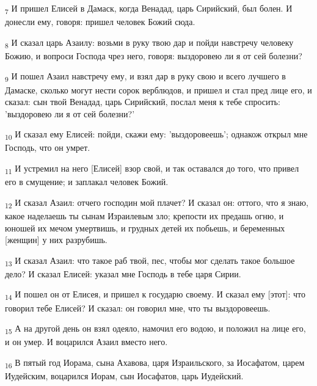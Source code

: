 \begin{tcolorbox}
\textsubscript{7} И пришел Елисей в Дамаск, когда Венадад, царь Сирийский, был болен. И донесли ему, говоря: пришел человек Божий сюда.
\end{tcolorbox}
\begin{tcolorbox}
\textsubscript{8} И сказал царь Азаилу: возьми в руку твою дар и пойди навстречу человеку Божию, и вопроси Господа чрез него, говоря: выздоровею ли я от сей болезни?
\end{tcolorbox}
\begin{tcolorbox}
\textsubscript{9} И пошел Азаил навстречу ему, и взял дар в руку свою и всего лучшего в Дамаске, сколько могут нести сорок верблюдов, и пришел и стал пред лице его, и сказал: сын твой Венадад, царь Сирийский, послал меня к тебе спросить: 'выздоровею ли я от сей болезни?'
\end{tcolorbox}
\begin{tcolorbox}
\textsubscript{10} И сказал ему Елисей: пойди, скажи ему: 'выздоровеешь'; однакож открыл мне Господь, что он умрет.
\end{tcolorbox}
\begin{tcolorbox}
\textsubscript{11} И устремил на него [Елисей] взор свой, и так оставался до того, что привел его в смущение; и заплакал человек Божий.
\end{tcolorbox}
\begin{tcolorbox}
\textsubscript{12} И сказал Азаил: отчего господин мой плачет? И сказал он: оттого, что я знаю, какое наделаешь ты сынам Израилевым зло; крепости их предашь огню, и юношей их мечом умертвишь, и грудных детей их побьешь, и беременных [женщин] у них разрубишь.
\end{tcolorbox}
\begin{tcolorbox}
\textsubscript{13} И сказал Азаил: что такое раб твой, пес, чтобы мог сделать такое большое дело? И сказал Елисей: указал мне Господь в тебе царя Сирии.
\end{tcolorbox}
\begin{tcolorbox}
\textsubscript{14} И пошел он от Елисея, и пришел к государю своему. И сказал ему [этот]: что говорил тебе Елисей? И сказал: он говорил мне, что ты выздоровеешь.
\end{tcolorbox}
\begin{tcolorbox}
\textsubscript{15} А на другой день он взял одеяло, намочил его водою, и положил на лице его, и он умер. И воцарился Азаил вместо него.
\end{tcolorbox}
\begin{tcolorbox}
\textsubscript{16} В пятый год Иорама, сына Ахавова, царя Израильского, за Иосафатом, царем Иудейским, воцарился Иорам, сын Иосафатов, царь Иудейский.
\end{tcolorbox}
